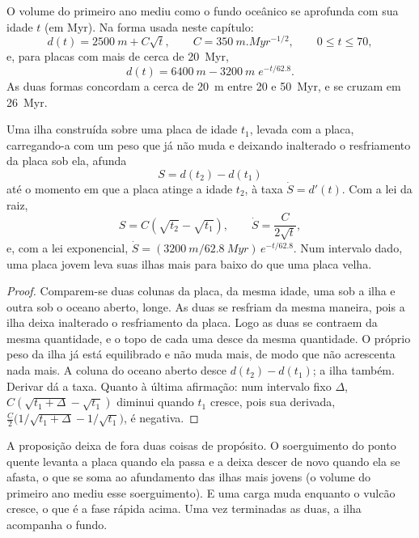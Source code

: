 O volume do primeiro ano mediu como o fundo oceânico se aprofunda com sua idade $t$ (em \unit{Myr}). Na
forma usada neste capítulo:
\[
d(t) = \qty{2500}{m} + C\sqrt{t}, \qquad C = \qty{350}{m.Myr^{-1/2}}, \qquad 0 \le t \le 70,
\]
e, para placas com mais de cerca de \qty{20}{Myr},
\[
d(t) = \qty{6400}{m} - \qty{3200}{m}\; e^{-t/62.8}.
\]
As duas formas concordam a cerca de \qty{20}{m} entre 20 e \qty{50}{Myr}, e se cruzam em
\qty{26}{Myr}.

\begin{proposition}\label{prop:b2:oceanic-islands:sinking}
Uma ilha construída sobre uma placa de idade $t_1$, levada com a placa, carregando-a com um peso que
já não muda e deixando inalterado o resfriamento da placa sob ela, afunda
\[
S = d(t_2) - d(t_1)
\]
até o momento em que a placa atinge a idade $t_2$, à taxa $\dot S = d'(t)$. Com a lei da raiz,
\[
S = C\left(\sqrt{t_2} - \sqrt{t_1}\right), \qquad \dot S = \frac{C}{2\sqrt t},
\]
e, com a lei exponencial, $\dot S = (\qty{3200}{m}/\qty{62.8}{Myr})\,e^{-t/62.8}$. Num
intervalo dado, uma placa jovem leva suas ilhas mais para baixo do que uma placa velha.
\end{proposition}

\begin{proof}
Comparem-se duas colunas da placa, da mesma idade, uma sob a ilha e outra sob o oceano aberto,
longe. As duas se resfriam da mesma maneira, pois a ilha deixa inalterado o resfriamento da placa. Logo as duas se contraem da mesma quantidade, e o topo de cada uma desce da mesma
quantidade. O próprio peso da ilha já está equilibrado e não muda mais, de modo que não acrescenta nada
mais. A coluna do oceano aberto desce $d(t_2) - d(t_1)$; a ilha também. Derivar
dá a taxa. Quanto à última afirmação: num intervalo fixo $\Delta$, $C(\sqrt{t_1 + \Delta} -
\sqrt{t_1})$ diminui quando $t_1$ cresce, pois sua derivada, $\frac C2\bigl(1/\sqrt{t_1 + \Delta}
- 1/\sqrt{t_1}\bigr)$, é negativa.
\end{proof}

A proposição deixa de fora duas coisas de propósito. O soerguimento do ponto quente levanta a placa quando ela
passa e a deixa descer de novo quando ela se afasta, o que se soma ao afundamento das ilhas mais jovens
(o volume do primeiro ano mediu esse soerguimento). E uma carga muda enquanto o vulcão cresce, o que é a
fase rápida acima. Uma vez terminadas as duas, a ilha acompanha o fundo.

